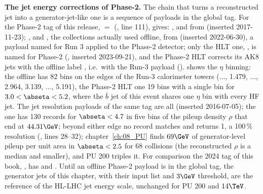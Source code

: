 \textbf{The jet energy corrections of Phase-2.} The chain that turns a reconstructed jet into a generator-jet-like
one is a sequence of  payloads in the global tag. For the Phase-2 tag of this
release,  $=$ 
(, line 111),  gives: ,  and
 from  (inserted 2017-11-23); ,  and
, the collections actually used offline, from  (inserted 2022-06-30), a
payload named for Run 3 applied to the Phase-2 detector; only the HLT one, , is named for
Phase-2 (, inserted 2023-09-21), and the Phase-2 HLT corrects its AK8 jets with the
offline label , i.e.\ with the Run-3 payload
(). 
shows the $\eta$ binning: the offline   has 82 bins on the edges of the Run-3
calorimeter towers ($\ldots$, 1.479, $\ldots$, 2.964, 3.139, $\ldots$, 5.191), the Phase-2 HLT one 19 bins with a
single bin for $3.0<\abseta<5.2$, where the $\bar b$ jet of this event shares one $\eta$ bin with every HF jet. The
jet resolution payloads of the same tag are all  (inserted 2016-07-05); the
 one has 130 records for $\abseta<4.7$ in five bins of the pileup density $\rho$ that end at
$44.31\GeV$; beyond either edge no record matches and  returns 1, a 100\,\%
resolution (, lines 28--32); chapter~\ref{ch:08_PU} finds
$69\GeV$ of generator-level pileup \pt{} per unit area in $\abseta<2.5$ for 68 collisions (the reconstructed $\rho$
is a median and smaller), and PU 200 triples it. For comparison the 2024 tag of this book, , has
 and . Until an offline Phase-2 payload is in the
global tag, the generator jets of this chapter, with their input list and $3\GeV$ threshold, are the reference of
the HL-LHC jet energy scale, unchanged for PU 200 and $14\TeV$.
